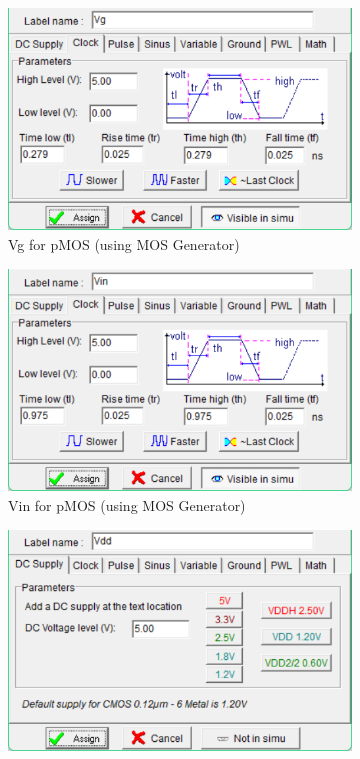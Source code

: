 \documentclass[a4paper,12pt]{article}
\begin{document}
\begin{figure}[H]
		\begin{subfigure}[t]{0.32\textwidth}
			\centering
			\includegraphics[width=1\textwidth, height=0.13\textheight]{Images/Builtin pmos/pspec4.png}
			\caption{Vg for pMOS (using MOS Generator)}
			\label{fig:3-h}
		\end{subfigure}
		\hfill
		\begin{subfigure}[t]{0.32\textwidth}
			\centering
			\includegraphics[width=1\textwidth, height=0.13\textheight]{Images/Builtin pmos/pspec5.png}
			\caption{Vin for pMOS (using MOS Generator)}
			\label{fig:3-i}
		\end{subfigure}
		\hfill
		\begin{subfigure}[t]{0.32\textwidth}
			\centering
			\includegraphics[width=1\textwidth, height=0.13\textheight]{Images/Builtin pmos/pspec6.png}

\end{subfigure}
\end{figure}
\end{document}

